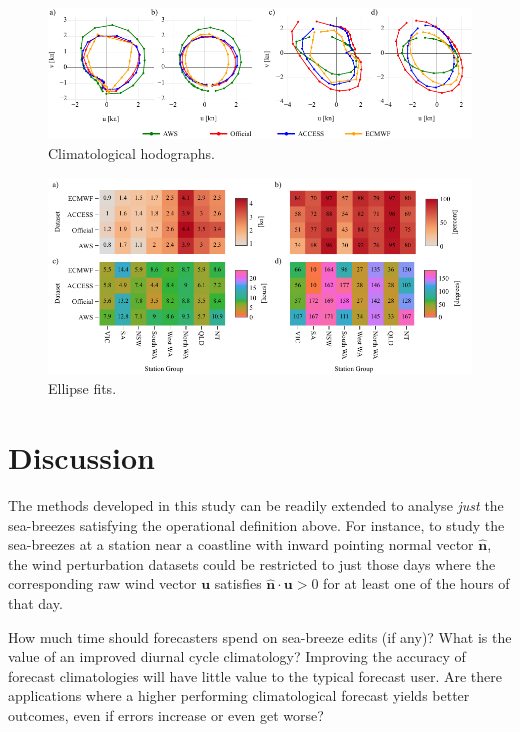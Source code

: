 \documentclass[alpha-refs]{wiley-article}
\begin{document}
\begin{figure}
\centering
\includegraphics{clim_hodo.pdf}
\caption{Climatological hodographs.}
\label{Fig:airport_wpi}
\end{figure}

\begin{figure}
\centering
\includegraphics{ellipse_stats.pdf}
\caption{Ellipse fits.}
\label{Fig:time_series_and_hodo}
\end{figure}

\section{Discussion}
\label{discussion}
The methods developed in this study can be readily extended to analyse \emph{just} the sea-breezes satisfying the operational definition above. For instance, to study the sea-breezes at a station near a coastline with inward pointing normal vector $\widehat{\boldsymbol{n}}$, the wind perturbation datasets could be restricted to just those days where the corresponding raw wind vector $\boldsymbol{u}$ satisfies $\widehat{\boldsymbol{n}} \cdot \boldsymbol{u} > 0$ for at least one of the hours of that day.

How much time should forecasters spend on sea-breeze edits (if any)? What is the value of an improved diurnal cycle climatology? Improving the accuracy of forecast climatologies will have little value to the typical forecast user. Are there applications where a higher performing climatological forecast yields better outcomes, even if errors increase or even get worse? 
\end{document}
